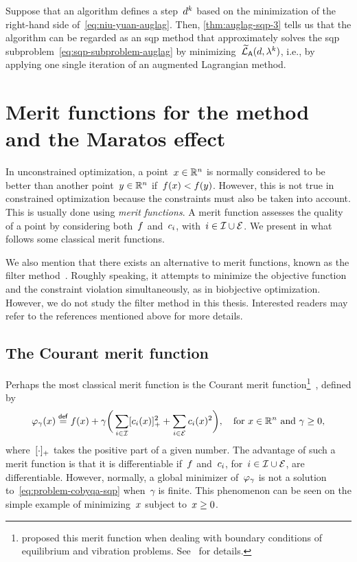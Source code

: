 Suppose that an algorithm defines a step~$\step[k]$ based on the minimization of the right-hand side of~\cref{eq:niu-yuan-auglag}.
Then, \cref{thm:auglag-sqp-3} tells us that the algorithm can be regarded as an \gls{sqp} method that approximately solves the \gls{sqp} subproblem~\cref{eq:sqp-subproblem-auglag} by minimizing~$\auglagalt(\step, \lm[k])$, i.e., by applying one single iteration of an augmented Lagrangian method.

\section{Merit functions for the  method and the Maratos effect}
\label{sec:sqp-merit-functions}

In unconstrained optimization, a point~$x \in \mathbb{R}^n$ is normally considered to be better than another point~$y \in \mathbb{R}^n$ if~$f(x) < f(y)$.
However, this is not true in constrained optimization because the constraints must also be taken into account.
This is usually done using \emph{merit functions}.
A merit function assesses the quality of a point by considering both~$f$ and~$c_{i}$, with~$i \in \mathcal{I} \cup \mathcal{E}$.
We present in what follows some classical merit functions.

We also mention that there exists an alternative to merit functions, known as the filter method~\cite{Fletcher_Leyffer_2002,Fletcher_Leyffer_Toint_1998,Fletcher_Leyffer_Toint_2002,Fletcher_Leyffer_Toint_2006,Riberio_Karas_Gonzaga_2008}.
Roughly speaking, it attempts to minimize the objective function and the constraint violation simultaneously, as in biobjective optimization.
However, we do not study the filter method in this thesis.
Interested readers may refer to the references mentioned above for more details.

\subsection{The Courant merit function}

Perhaps the most classical merit function is the Courant merit function\footnote{\citeauthor{Courant_1943} proposed this merit function when dealing with boundary conditions of equilibrium and vibration problems. See~\cite[Pt.~II, \S~3]{Courant_1943} for details.}~\cite{Courant_1943}, defined by
\begin{equation*}
    \merit_{\gamma}(\iter) \eqdef \obj(\iter) + \gamma \bigg( \sum_{i \in \iub} \posp{\con{i}(\iter)}^2 + \sum_{i \in \ieq} \con{i}(\iter)^2 \bigg), \quad \text{for~$x \in \R^n$ and~$\gamma \ge 0$,}
\end{equation*}
%
where~$[\cdot]_+$ takes the positive part of a given number.
The advantage of such a merit function is that it is differentiable if~$f$ and~$c_{i}$, for~$i \in \mathcal{I} \cup \mathcal{E}$, are differentiable.
However, normally, a global minimizer of~$\merit_{\gamma}$ is not a solution to~\cref{eq:problem-cobyqa-sqp} when~$\gamma$ is finite.
This phenomenon can be seen on the simple example of minimizing~$\iter$ subject to~$\iter \ge 0$.

